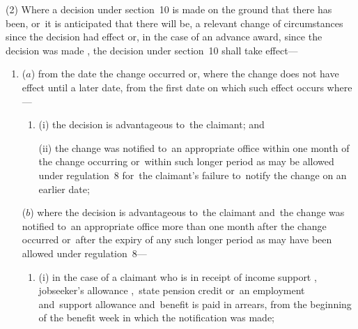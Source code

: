 \documentclass[12pt,a4paper]{article}
\begin{document}
(2) Where a decision under section~10 is made on the ground that there has been, or~it is anticipated that there will be, a relevant change of circumstances since the decision 
had effect  %
or, in the case of an advance award, since the decision was made%
, the decision under section~10 shall take effect—
\begin{enumerate}\item[]
%

($a$) from the date the change occurred or, where the change does not have effect until a later date, from the first date on which such effect occurs where---
\begin{enumerate}\item[]
(i) the decision is advantageous to~the claimant; and

(ii) the change was notified to~an appropriate office within one month of the change occurring or~within such longer period as may be allowed under regulation~8 for~the claimant’s failure to~notify the change on an earlier date;
\end{enumerate}

($b$) where the decision is advantageous to~the claimant and~the change was notified to~an appropriate office more than one month after the change occurred or~after the expiry of any such longer period as may have been allowed under regulation~8—
\begin{enumerate}\item[]
(i) in the case of a claimant who is in receipt of income support%
, jobseeker's allowance%
,~state pension credit or~an employment and~support allowance  %
and~benefit is paid in arrears, from the beginning of the benefit week in which the notification was made;


\end{enumerate}
\end{enumerate}
\end{document}
